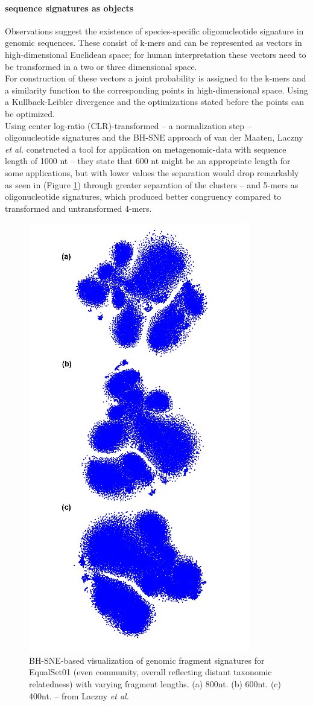 \documentclass[twocolumn]{bmcart}%
\begin{document}
\paragraph*{sequence signatures as objects}
Observations suggest the existence of species-specific oligonucleotide signature in genomic sequences\cite{Laczny2014}\cite{Cheng1194}. These consist of k-mers and can be represented as vectors in high-dimensional Euclidean space; for human interpretation these vectors need to be transformed in a two or three dimensional space\cite{Laczny2014}.\\
For construction of these vectors a joint probability is assigned to the k-mers and a similarity function to the corresponding points in high-dimensional space. Using a Kullback-Leibler divergence and the optimizations stated before the points can be optimized.\\
Using center log-ratio (CLR)-transformed -- a normalization step -- oligonucleotide signatures and the BH-SNE approach of van der Maaten, Laczny \textit{et al.} constructed a tool for application on metagenomic-data with sequence length of 1000 nt -- they state that 600 nt might be an appropriate length for some applications, but with lower values the separation would drop remarkably as seen in (Figure  \ref{img:seperation}) through greater separation of the clusters -- and 5-mers as oligonucleotide signatures, which produced better congruency compared to transformed and untransformed 4-mers.
\begin{figure}
	\centering
	\includegraphics[width=.6\linewidth]{bilder/seperation.png}
	\caption{BH-SNE-based visualization of genomic fragment signatures for
		EqualSet01 (even community, overall reflecting distant taxonomic relatedness) with varying
		fragment lengths.
		(a) 800nt.  (b) 600nt.  (c) 400nt. -- from Laczny \textit{et al.}\cite{Laczny2014}}
	\label{img:seperation}
\end{figure}
\end{document}
